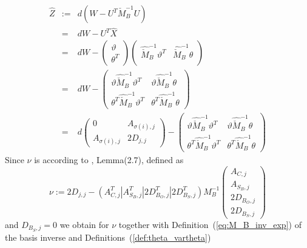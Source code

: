 \documentclass[a4paper]{article}
\begin{document}
\begin{eqnarray}
\hat{Z}
&:=&
d\left(W - U^{T}\check{M}_{B}^{-1}U\right)
\nonumber \\
&=&
dW - U^{T}\hat{X}
\nonumber \\
&=&
dW
-
\left(
\begin{array}{c}
\vartheta \\
\hline
\theta^{T}
\end{array}
\right)
\left(
\begin{array}{c|c}
\hat{\check{M}}_{B}^{-1}\vartheta^{T}
&
\hat{\check{M}}_{B}^{-1}\theta  \\
\end{array}
\right)
\nonumber \\
&=&
dW
-
\left(
\begin{array}{c|c}
\vartheta \hat{\check{M}}_{B}^{-1} \vartheta^{T}
&
\vartheta \hat{\check{M}}_{B}^{-1}\theta
\\
\hline
\theta^{T}\hat{\check{M}}_{B}^{-1}\vartheta^{T}
&
\theta^{T}\hat{\check{M}}_{B}^{-1}\theta
\end{array}
\right)
\nonumber \\
&=&
d
\left(
\begin{array}{c|c}
0                & A_{\sigma(i), j} \\
\hline
A_{\sigma(i), j} & 2D_{j,j}  
\end{array}
\right)
-
\left(
\begin{array}{c|c}
\vartheta \hat{\check{M}}_{B}^{-1} \vartheta^{T}
&
\vartheta \hat{\check{M}}_{B}^{-1}\theta
\\
\hline
\theta^{T}\hat{\check{M}}_{B}^{-1}\vartheta^{T}
&
\theta^{T}\hat{\check{M}}_{B}^{-1}\theta
\end{array}
\right)
\nonumber
\end{eqnarray}
Since $\nu$ is according to \cite{Sven}, Lemma(2.7), defined as
\begin{equation}
\nu:=
2D_{j,j}
-\left(
  A_{C,j}^{T}\left|\right.A_{S_{B}, j}^{T}\left|\right.
  2D_{B_{O},j}^{T} \left|\right. 2D_{B_{S}, j}^{T}
 \right)
M_{B}^{-1}
\left(
\begin{array}{c}
A_{C, j} \\
\hline
A_{S_{B},j} \\
\hline
2D_{B_{O}, j} \\
\hline
2D_{B_{S}, j}
\end{array}
\right) 
\end{equation}
and $D_{B_{S}, j}=0$ we obtain for $\nu$ together with
Definition~(\ref{eq:M_B_inv_exp}) of the basis inverse
and Definitions~(\ref{def:theta_vartheta})
\end{document}
